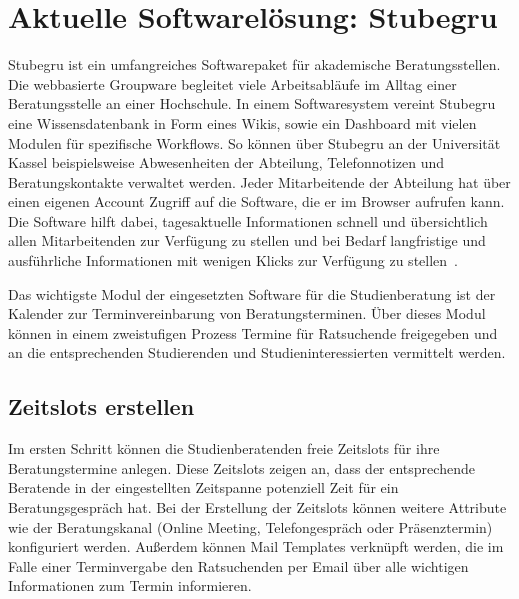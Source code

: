 \section{Aktuelle Softwarelösung: Stubegru}
Stubegru ist ein umfangreiches Softwarepaket für akademische Beratungsstellen.
Die webbasierte Groupware begleitet viele Arbeitsabläufe im Alltag einer
Beratungsstelle an einer Hochschule. In einem Softwaresystem vereint Stubegru
eine Wissensdatenbank in Form eines Wikis, sowie ein Dashboard mit vielen
Modulen für spezifische Workflows. So können über Stubegru an der Universität
Kassel beispielsweise Abwesenheiten der Abteilung, Telefonnotizen und
Beratungskontakte verwaltet werden. Jeder Mitarbeitende der Abteilung hat über
einen eigenen Account Zugriff auf die Software, die er im Browser aufrufen
kann. Die Software hilft dabei, tagesaktuelle Informationen schnell und
übersichtlich allen Mitarbeitenden zur Verfügung zu stellen und bei Bedarf
langfristige und ausführliche Informationen mit wenigen Klicks zur Verfügung zu
stellen~\cite{stubegruWebsite}.

Das wichtigste Modul der eingesetzten Software für die Studienberatung ist der
Kalender zur Terminvereinbarung von Beratungsterminen. Über dieses Modul können
in einem zweistufigen Prozess Termine für Ratsuchende freigegeben und an die
entsprechenden Studierenden und Studieninteressierten vermittelt werden.

\subsection*{Zeitslots erstellen}
Im ersten Schritt können die Studienberatenden freie Zeitslots für ihre
Beratungstermine anlegen. Diese Zeitslots zeigen an, dass der entsprechende
Beratende in der eingestellten Zeitspanne potenziell Zeit für ein
Beratungsgespräch hat. Bei der Erstellung der Zeitslots können weitere
Attribute wie der Beratungskanal (Online Meeting, Telefongespräch oder
Präsenztermin) konfiguriert werden. Außerdem können Mail Templates verknüpft
werden, die im Falle einer Terminvergabe den Ratsuchenden per Email über alle
wichtigen Informationen zum Termin informieren.

